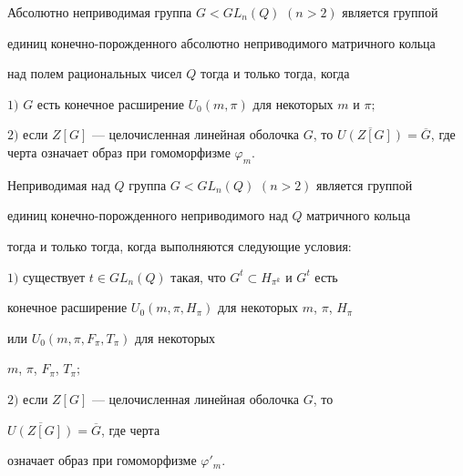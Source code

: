 \begin{thm}


Абсолютно неприводимая группа $G< GL_n(Q)$ $(n>2)$ является группой


единиц конечно-порожденного абсолютно неприводимого матричного кольца


над полем рациональных чисел $Q$ тогда и только тогда, когда





$1)$ $G$ есть конечное расширение $U_0(m,\pi )$ для некоторых $m$ и $\pi;$





$2)$ если $Z[G]$ --- целочисленная линейная оболочка $G$, то $\overline{U(Z[G])}=


\overline{G}$, где черта означает образ при гомоморфизме $\varphi_m$.


\end{thm}








\begin{thm}


Неприводимая над $Q$ группа $G< GL_n(Q)$ $(n>2)$ является группой


единиц конечно-порожденного неприводимого над $Q$ матричного кольца 


тогда и только тогда, когда выполняются следующие условия\/${:}$





$1)$ существует $t\in GL_n(Q)$ такая, что $G^t\subset H_{\pi ^k}$ и $G^t$ есть


конечное расширение $U_0(m,\pi,H_{\pi})$ для некоторых $m$, $\pi$, $H_{\pi}$


или $U_0(m,\pi,F_{\pi},T_{\pi})$ для некоторых


$m$, $\pi$, $F_{\pi}$, $T_{\pi};$





$2)$ если $Z[G]$ --- целочисленная линейная оболочка $G$, то


$\overline{U(Z[G])}=\overline{G}$, где черта


означает образ при гомоморфизме $\varphi '_m$.


\end{thm}








